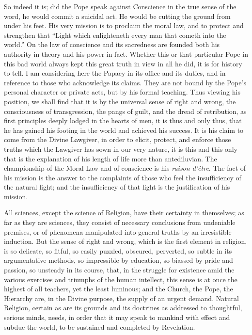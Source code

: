 So indeed it is; did the Pope speak against Conscience in the true
sense of the word, he would commit a suicidal act. He would be cutting
the ground from under his feet. His very mission is to proclaim the
moral law, and to protect and strengthen that ``Light which
enlighteneth every man that cometh into the world.'' On the law of
conscience and its sacredness are founded both his authority in theory
and his power in fact. Whether this or that particular Pope in this bad
world always kept this great truth in view in all he did, it is
for history to tell. I am considering here the Papacy in its office and
its duties, and in reference to those who acknowledge its claims. They
are not bound by the Pope's personal character or private acts, but by
his formal teaching. Thus viewing his position, we shall find that it is
by the universal sense of right and wrong, the consciousness of
transgression, the pangs of guilt, and the dread of retribution, as
first principles deeply lodged in the hearts of men, it is thus and only
thus, that he has gained his footing in the world and achieved his
success. It is his claim to come from the Divine Lawgiver, in order to
elicit, protect, and enforce those truths which the Lawgiver has sown in
our very nature, it is this and this only that is the explanation of his
length of life more than antediluvian. The championship of the Moral Law
and of conscience is his \emph{raison d'être}. The fact of his mission
is the answer to the complaints of those who feel the insufficiency of
the natural light; and the insufficiency of that light is the
justification of his mission.

All sciences, except the science of Religion, have their certainty in
themselves; as far as they are sciences, they consist of necessary
conclusions from undeniable premises, or of phenomena manipulated into
general truths by an irresistible induction. But the sense of right and
wrong, which is the first element in religion, is so delicate, so
fitful, so easily puzzled, obscured, perverted, so subtle in its
argumentative methods, so impressible by education, so biassed by pride
and passion, so unsteady in its course, that, in the struggle for
existence amid the various exercises and triumphs of the human
intellect, this sense is at once the highest of all teachers, yet
the least luminous; and the Church, the Pope, the Hierarchy are, in the
Divine purpose, the supply of an urgent demand. Natural Religion,
certain as are its grounds and its doctrines as addressed to thoughtful,
serious minds, needs, in order that it may speak to mankind with effect
and subdue the world, to be sustained and completed by Revelation.


